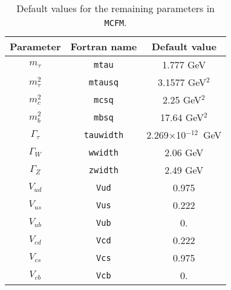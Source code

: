\documentclass[12pt]{article}
\begin{document}
\begin{table}
\begin{center}
\begin{tabular}{|c|c|c|} \hline
Parameter & Fortran name & Default value \\ 
\hline
$m_\tau$         & {\tt mtau}      & 1.777 GeV            \\
$m^2_\tau$& {\tt mtausq}  & 3.1577 GeV$^2$     \\
$m^2_c$   & {\tt mcsq}    & 2.25  GeV$^2$       \\
$m^2_b$   & {\tt mbsq}    & 17.64 GeV$^2$       \\
$\Gamma_\tau$    & {\tt tauwidth}& 2.269$\times$10$^{-12}$~GeV \\
$\Gamma_W$       & {\tt wwidth}  & 2.06 GeV               \\
$\Gamma_Z$       & {\tt zwidth}  & 2.49 GeV               \\
$V_{ud}$         & {\tt Vud}     & 0.975                  \\
$V_{us}$         & {\tt Vus}     & 0.222             \\
$V_{ub}$         & {\tt Vub}     & 0.                     \\
$V_{cd}$         & {\tt Vcd}     & 0.222             \\
$V_{cs}$         & {\tt Vcs}     & 0.975                  \\
$V_{cb}$         & {\tt Vcb}     & 0.                     \\
\hline
\end{tabular}
\caption{Default values for the remaining parameters in {\tt MCFM}.}
\label{default} 
\end{center}
\end{table}
\end{document}
